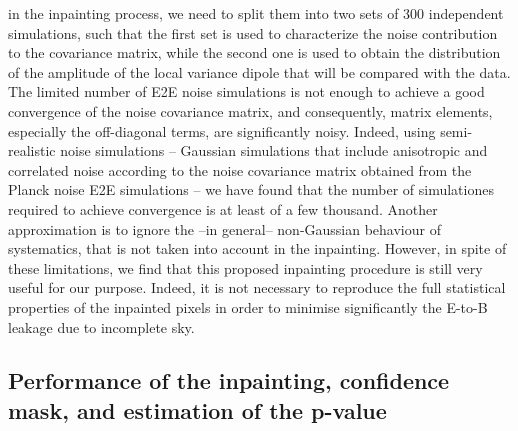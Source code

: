 in the inpainting process, we need to split them into two sets of 300 independent simulations, such that the first set is used to characterize the noise contribution to the covariance matrix, while the second one is used to obtain the distribution of the amplitude of the local variance dipole that will be compared with the data. 
The limited number of E2E noise simulations is not enough to achieve a good convergence of the noise covariance matrix, and consequently, matrix elements, especially the off-diagonal terms, are 
 significantly noisy. Indeed, using semi-realistic noise simulations -- Gaussian simulations that include anisotropic and correlated noise according to the noise covariance matrix obtained from the Planck noise E2E simulations -- we have found that the number of simulationes required to achieve convergence is at least of a few thousand. Another approximation is to ignore the --in general-- non-Gaussian behaviour of systematics, that is not taken into account in the inpainting. However, in spite of these limitations, 
 we find that this proposed inpainting procedure is still very useful for our purpose.
Indeed, it is not necessary to reproduce the full statistical properties of the inpainted pixels in order to minimise significantly the E-to-B leakage due to incomplete sky.

\subsection{Performance of the inpainting, confidence mask, and estimation of the p-value}\label{subsection:3.2}

